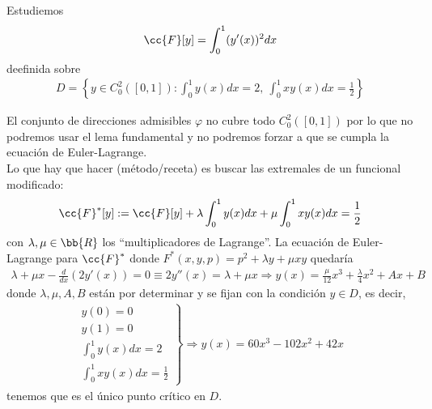 
\begin{ejemplo}
    Estudiemos 
    \begin{gather*}
        \cc{F}[y] = \int_{0}^{1} (y'(x))^2 dx
    \end{gather*}
    deefinida sobre 
    \begin{gather*}
        D = \left\{ y\in C_0^2([0,1]) : \int_{0}^{1} y(x) dx = 2,\ \int_{0}^{1} xy(x) dx = \frac{1}{2} \right\}
    \end{gather*}

    El conjunto de direcciones admisibles $\varphi$ no cubre todo $C_0^2([0,1])$ por lo que no podremos usar el lema fundamental y no podremos forzar a que se cumpla la ecuación de Euler-Lagrange.\\

    Lo que hay que hacer (método/receta) es buscar las extremales de un funcional modificado:
    \begin{gather*}
        \cc{F}^*[y] := \cc{F}[y] + \lambda \int_{0}^{1} y(x) dx + \mu \int_{0}^{1} xy(x) dx = \frac{1}{2}
    \end{gather*}
    con $\lambda, \mu\in \bb{R}$ los ``multiplicadores de Lagrange''. La ecuación de Euler-Lagrange para $\cc{F}^*$ donde $F^*(x,y,p) = p^2 + \lambda y + \mu xy$ quedaría
    \begin{gather*}
        \lambda + \mu x - \frac{d}{dx}(2y'(x)) = 0 \equiv 2y''(x) = \lambda + \mu x \Rightarrow y(x) = \frac{\mu}{12}x^3 + \frac{\lambda}{4}x^2 + Ax + B
    \end{gather*}
    donde $\lambda, \mu, A, B$ están por determinar y se fijan con la condición $y\in D$, es decir, 
    \begin{gather*}
        \left.
            \begin{array}{l}
                y(0)=0\\
                y(1)=0\\
                \int_{0}^{1} y(x) dx = 2\\
                \int_{0}^{1} xy(x) dx = \frac{1}{2}
            \end{array}
        \right\} \Rightarrow y(x) = 60x^3 - 102x^2 + 42x
    \end{gather*}
    tenemos que es el único punto crítico en $D$.
\end{ejemplo}

